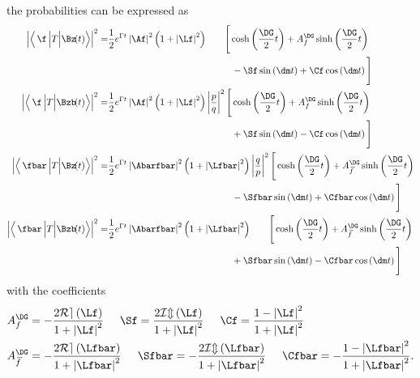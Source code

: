 the probabilities can be expressed as
\begin{align}
\left|\left<\,\f\,\Big|T\Big|\Bz\!(t)\right>\right|^2 =&
\frac{1}{2}e^{\Gamma t}\left|\Af\right|^2\left(1+\left|\Lf\right|^2\right)\hphantom{\left|\frac{p}{q}\right|^2}
\Bigg[\cosh\left(\frac{\DG}{2}t\right) + A_f^{\DG}\sinh\left(\frac{\DG}{2}t\right)\nonumber\\
&\hphantom{\frac{1}{2}e^{\Gamma t}\left|\Af\right|^2\left(1+\left|\Lf\right|^2\right)\left|\frac{p}{q}\right|^2\Bigg[}
-\Sf\sin\left(\dm t\right)+\Cf\cos\left(\dm t\right)\Bigg]\\
\left|\left<\,\f\,\Big|T\Big|\Bzb\!(t)\right>\right|^2 =&
\frac{1}{2}e^{\Gamma t}\left|\Af\right|^2\left(1+\left|\Lf\right|^2\right)\left|\frac{p}{q}\right|^2
\Bigg[\cosh\left(\frac{\DG}{2}t\right) + A_f^{\DG}\sinh\left(\frac{\DG}{2}t\right)\nonumber\\
&\hphantom{\frac{1}{2}e^{\Gamma t}\left|\Af\right|^2\left(1+\left|\Lf\right|^2\right)\left|\frac{p}{q}\right|^2\Bigg[}
+\Sf\sin\left(\dm t\right)-\Cf\cos\left(\dm t\right)\Bigg]\\
\left|\left<\,\fbar\,\Big|T\Big|\Bz\!(t)\right>\right|^2 =&
\frac{1}{2}e^{\Gamma t}\left|\Abarfbar\right|^2\left(1+\left|\Lfbar\right|^2\right)\left|\frac{q}{p}\right|^2
\Bigg[\cosh\left(\frac{\DG}{2}t\right) + A_{\kern 1.5pt\overline{\kern -1.5pt f\kern 1.5pt}}^{\DG}\sinh\left(\frac{\DG}{2}t\right)\nonumber\\
&\hphantom{\frac{1}{2}e^{\Gamma t}\left|\Af\right|^2\left(1+\left|\Lf\right|^2\right)\left|\frac{q}{p}\right|^2\Bigg[}
-\Sfbar\sin\left(\dm t\right)+\Cfbar\cos\left(\dm t\right)\Bigg]\\
\left|\left<\,\fbar\,\Big|T\Big|\Bzb\!(t)\right>\right|^2 =&
\frac{1}{2}e^{\Gamma t}\left|\Abarfbar\right|^2\left(1+\left|\Lfbar\right|^2\right)\hphantom{\left|\frac{q}{p}\right|^2}
\Bigg[\cosh\left(\frac{\DG}{2}t\right) + A_{\kern 1.5pt\overline{\kern -1.5pt f\kern 1.5pt}}^{\DG}\sinh\left(\frac{\DG}{2}t\right)\nonumber\\
&\hphantom{\frac{1}{2}e^{\Gamma t}\left|\Af\right|^2\left(1+\left|\Lf\right|^2\right)\left|\frac{q}{p}\right|^2\Bigg[}
+\Sfbar\sin\left(\dm t\right)-\Cfbar\cos\left(\dm t\right)\Bigg]
\end{align}
with the \CP coefficients
\begin{align}
A_f^{\DG}&=-\frac{2\mathcal{Re}\left(\Lf\right)}{1+\left|\Lf\right|^2}\hspace{0.5cm}
\Sf=\frac{2\mathcal{Im}\left(\Lf\right)}{1+\left|\Lf\right|^2}\hspace{0.5cm}
\Cf=\frac{1-\left|\Lf\right|^2}{1+\left|\Lf\right|^2}\\
A_{\kern 1.5pt\overline{\kern -1.5pt f\kern 1.5pt}}^{\DG}&=-\frac{2\mathcal{Re}\left(\Lfbar\right)}{1+\left|\Lfbar\right|^2}\hspace{0.5cm}
\Sfbar=-\frac{2\mathcal{Im}\left(\Lfbar\right)}{1+\left|\Lfbar\right|^2}\hspace{0.5cm}
\Cfbar=-\frac{1-\left|\Lfbar\right|^2}{1+\left|\Lfbar\right|^2}.
\end{align}
